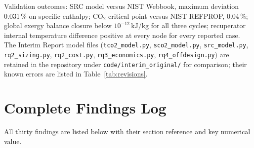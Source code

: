 \documentclass[12pt,a4paper]{report}
\begin{document}
Validation outcomes: SRC model versus NIST Webbook, maximum deviation
0.031\,\% on specific enthalpy; CO$_2$ critical point versus NIST REFPROP,
0.04\,\%; global exergy balance closure below $10^{-12}$\,kJ/kg for all
three cycles; recuperator internal temperature difference positive at every
node for every reported case. The Interim Report model files
(\texttt{tco2\_model.py}, \texttt{sco2\_model.py}, \texttt{src\_model.py},
\texttt{rq2\_sizing.py}, \texttt{rq2\_cost.py}, \texttt{rq3\_economics.py},
\texttt{rq4\_offdesign.py}) are retained in the repository under
\texttt{code/interim\_original/} for comparison; their known errors are
listed in Table~\ref{tab:revisions}.

\chapter{Complete Findings Log}
\label{app:findings}

All thirty findings are listed below with their section reference and key
numerical value.
\end{document}
